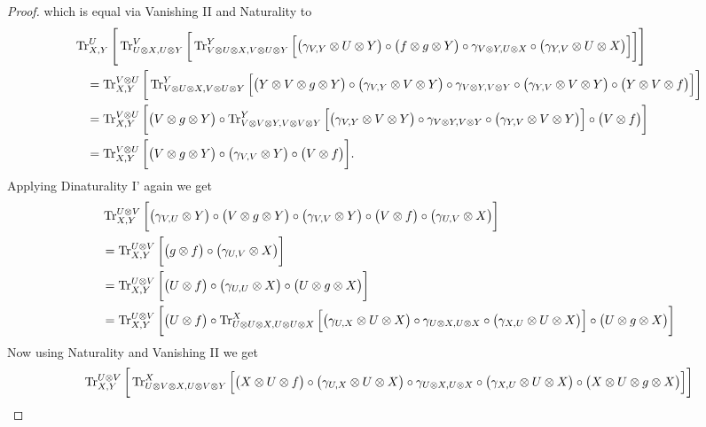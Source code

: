 \documentclass[12pt,oneside,article,draft]{memoir}
\begin{document}
\begin{proof}
{ which is equal via Vanishing II and Naturality to
 \begin{align*}
  &\operatorname{Tr}^U_{X,Y}\Bigg[\operatorname{Tr}^V_{U\otimes X,U\otimes Y}\bigg[\operatorname{Tr}^Y_{V\otimes U\otimes X,V\otimes U\otimes Y}\Big[\big(\gamma_{V,Y}\otimes U\otimes Y\big)\circ\big(f\otimes g\otimes Y\big)\circ\gamma_{V\otimes Y,U\otimes X}\circ\big(\gamma_{Y,V}\otimes U\otimes X\big)\Big]\bigg]\Bigg]\\
  &\quad=\operatorname{Tr}^{V\otimes U}_{X,Y}\bigg[\operatorname{Tr}^Y_{V\otimes U\otimes X,V\otimes U\otimes Y}\Big[\big(Y\otimes V\otimes g\otimes Y\big)\circ\big(\gamma_{V,Y}\otimes V\otimes Y\big)\circ\gamma_{V\otimes Y,V\otimes Y}\circ\big(\gamma_{Y,V}\otimes V\otimes Y\big)\circ\big(Y\otimes V\otimes f\big)\Big]\bigg]\\
  &\quad=\operatorname{Tr}^{V\otimes U}_{X,Y}\bigg[\big(V\otimes g\otimes Y\big)\circ\operatorname{Tr}^Y_{V\otimes V\otimes Y,V\otimes V\otimes Y}\Big[\big(\gamma_{V,Y}\otimes V\otimes Y\big)\circ\gamma_{V\otimes Y,V\otimes Y}\circ\big(\gamma_{Y,V}\otimes V\otimes Y\big)\Big]\circ\big(V\otimes f\big)\bigg]\\
  &\quad=\operatorname{Tr}^{V\otimes U}_{X,Y}\bigg[\big(V\otimes g\otimes Y\big)\circ\big(\gamma_{V,V}\otimes Y\big)\circ\big(V\otimes f\big)\bigg].
 \end{align*}
 Applying Dinaturality I' again we get
 \begin{align*}
  &\operatorname{Tr}^{U\otimes V}_{X,Y}\bigg[\big(\gamma_{V,U}\otimes Y\big)\circ\big(V\otimes g\otimes Y\big)\circ\big(\gamma_{V,V}\otimes Y\big)\circ\big(V\otimes f\big)\circ\big(\gamma_{U,V}\otimes X\big)\bigg]\\
  &=\operatorname{Tr}^{U\otimes V}_{X,Y}\bigg[\big(g\otimes f\big)\circ\big(\gamma_{U,V}\otimes X\big)\bigg]\\
  &=\operatorname{Tr}^{U\otimes V}_{X,Y}\bigg[\big(U\otimes f\big)\circ\big(\gamma_{U,U}\otimes X\big)\circ\big(U\otimes g\otimes X\big)\bigg]\\
  &=\operatorname{Tr}^{U\otimes V}_{X,Y}\bigg[\big(U\otimes f\big)\circ\operatorname{Tr}^X_{U\otimes U\otimes X,U\otimes U\otimes X}\Big[\big(\gamma_{U,X}\otimes U\otimes X\big)\circ\gamma_{U\otimes X, U\otimes X}\circ\big(\gamma_{X,U}\otimes U\otimes X\big)\Big]\circ\big(U\otimes g\otimes X\big)\bigg]
 \end{align*}
 Now using Naturality and Vanishing II we get
 \begin{align*}
  &\Tr^{U\otimes V}_{X,Y}\bigg[\Tr^X_{U\otimes V\otimes X,U\otimes V\otimes Y}\Big[\big(X\otimes U\otimes f\big)\circ\big(\gamma_{U,X}\otimes U\otimes X\big)\circ\gamma_{U\otimes X, U\otimes X}\circ\big(\gamma_{X,U}\otimes U\otimes X\big)\circ\big(X\otimes U\otimes g\otimes X\big)\Big]\bigg]\\

\end{align*}}
\end{proof}
\end{document}
